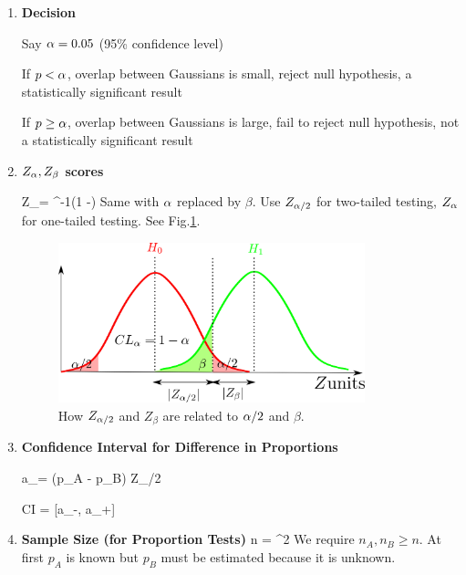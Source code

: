 \begin{enumerate}
\item {\bf Decision}

Say $\alpha=0.05$ (95\% confidence level)

If $p< \alpha$,  overlap between Gaussians is small, reject null hypothesis,
a statistically significant result

If $p \geq \alpha$, overlap between Gaussians is large, fail to reject null hypothesis, not a statistically significant result

\item {\bf $Z_\alpha, Z_\beta$  scores}

\beq
Z_\alp=
\Phi^{-1}(1 -\alp)
\eeq
Same with $\alpha$ replaced by $\beta$.
Use $Z_{\alpha/2}$ for two-tailed testing, $Z_\alpha$ for one-tailed testing. See Fig.\ref{fig-alp-beta-z}.

\begin{figure}[h!]
\centering
\includegraphics[width=3.5in]
{a-b-testing/alp-beta-z.png}
\caption{How $Z_{\alpha/2}$ and $Z_\beta$ are
related to $\alpha/2$ and $\beta$.}
\label{fig-alp-beta-z}
\end{figure}

\item {\bf Confidence Interval for Difference in Proportions} 

\beq
a_\pm = (p_A - p_B) \pm Z_{\alpha/2} 
\eeq

\beq
CI = [a_-, a_+]
\eeq



\item {\bf Sample Size 
(for Proportion Tests)}
\beq
n = 
^2
\eeq
We require $n_A, n_B\geq n$.
At first $p_A$ is known but $p_B$ 
must be
estimated because it is unknown.
\end{enumerate}
